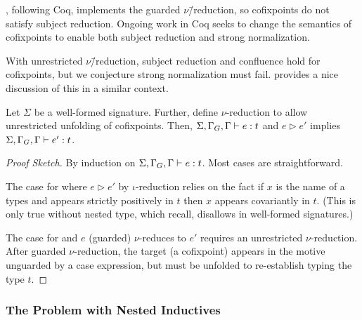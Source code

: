 \lang, following Coq, implements the guarded $\nu$\=/reduction, so cofixpoints do not satisfy subject reduction.
Ongoing work in Coq seeks to change the semantics of cofixpoints to enable both subject reduction and strong normalization.

With unrestricted $\nu$\=/reduction, subject reduction and confluence hold for cofixpoints, but we conjecture strong normalization must fail.
\citet{cc-hat-omega} provides a nice discussion of this in a similar context.

\begin{theorem}
  \label{thm:metatheory:sr}
  Let $\Sigma$ be a well-formed signature.
  Further, define $\nu$-reduction to allow unrestricted unfolding
  of cofixpoints.
  Then, $\Sigma, \Gamma_G, \Gamma \vdash e : t$ and $e \rhd e'$ implies
  $\Sigma, \Gamma_G, \Gamma \vdash e' : t$.
\end{theorem}
%
\begin{proof}[Proof Sketch]
  By induction on $\Sigma, \Gamma_G, \Gamma \vdash e : t$. Most cases are straightforward.

  The case for  where $e \rhd e'$ by $\iota$-reduction relies on the fact
  if $x$ is the name of a \coinductive types and appears strictly positively in
  $t$ then $x$ appears covariantly in $t$.
  (This is only true without nested \coinductive type, which recall, \lang disallows in well-formed signatures.)

  The case for  and $e$ (guarded) $\nu$-reduces to $e'$ requires an unrestricted $\nu$-reduction.
  After guarded $\nu$-reduction, the target (a cofixpoint) appears in the motive unguarded by a case expression, but must be unfolded to re-establish typing the type $t$.
\end{proof}

\subsubsection{The Problem with Nested Inductives}

\newcommand{\nat}{\const{N}}

